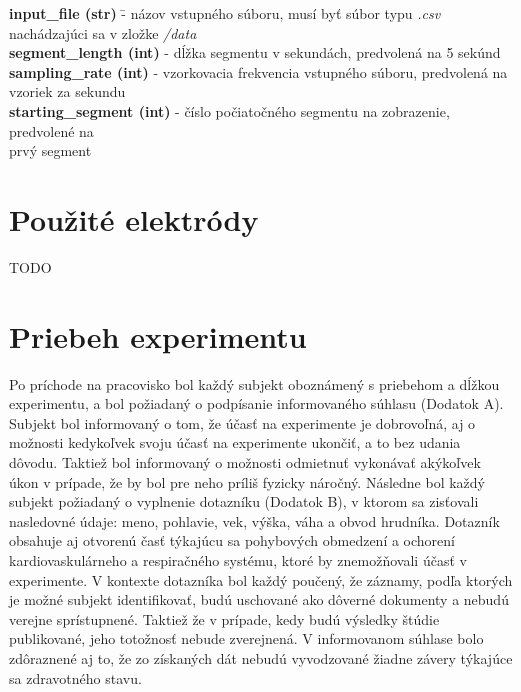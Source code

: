 \begin{tabbing}
    \indent \textbf{input\_file (str)} \quad\quad\quad\quad \= - názov vstupného súboru, musí byť súbor typu \textit{.csv}\\
                                                            \> nachádzajúci sa v zložke \textit{/data}\\
    \indent \textbf{segment\_length (int)}                  \> - dĺžka segmentu v sekundách, predvolená na 5 sekúnd\\
    \indent \textbf{sampling\_rate (int)}                   \> - vzorkovacia frekvencia vstupného súboru, predvolená na\\
                                                             vzoriek za sekundu\\
    \indent \textbf{starting\_segment (int)}                \> - číslo počiatočného segmentu na zobrazenie, predvolené na\\
                                                            \> prvý segment\\
\end{tabbing}


\section{Použité elektródy}

TODO


\section{Priebeh experimentu}

Po príchode na pracovisko bol každý subjekt oboznámený s priebehom a dĺžkou experimentu, a bol požiadaný o podpísanie informovaného súhlasu (Dodatok A). Subjekt bol informovaný o tom, že účasť na experimente je dobrovoľná, aj o možnosti kedykoľvek svoju účasť na experimente ukončiť, a to bez udania dôvodu. Taktiež bol informovaný o možnosti odmietnuť vykonávať akýkoľvek úkon v prípade, že by bol pre neho príliš fyzicky náročný. Následne bol každý subjekt požiadaný o vyplnenie dotazníku (Dodatok B), v ktorom sa zisťovali nasledovné údaje: meno, pohlavie, vek, výška, váha a obvod hrudníka. Dotazník obsahuje aj otvorenú časť týkajúcu sa pohybových obmedzení a ochorení kardiovaskulárneho a respiračného systému, ktoré by znemožňovali účasť v experimente. V kontexte dotazníka bol každý poučený, že záznamy, podľa ktorých je možné subjekt identifikovať, budú uschované ako dôverné dokumenty a nebudú verejne sprístupnené. Taktiež že v prípade, kedy budú výsledky štúdie publikované, jeho totožnosť nebude zverejnená. V informovanom súhlase bolo zdôraznené aj to, že zo získaných dát nebudú vyvodzované žiadne závery týkajúce sa zdravotného stavu.

